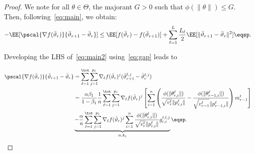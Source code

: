\documentclass[twoside]{article}
\begin{document}
\begin{proof}
We note for all $\theta \in \Theta$, the majorant $G > 0$ such that $\phi(\|\theta \|) \leq G$. 
Then, following~\eqref{eq:main}, we obtain:
\begin{align}\label{eq:main2}
- \EE[  \pscal{\nabla f(\bar{\vartheta}_r)}{\bar{\vartheta}_{r+1} - \bar{\vartheta}_r}]  \leq  \EE[ f(\bar{\vartheta}_r) - f(\bar{\vartheta}_{r+1})] + \sum_{\ell =1}^L \frac{L_\ell}{2} \EE[  \| \bar{\vartheta}_{r+1} - \bar{\vartheta}_r \|^2] \eqsp.
\end{align}

Developing the LHS of~\eqref{eq:main2} using~\eqref{eq:gap} leads to

\begin{align}\label{eq:inner}
\pscal{\nabla f(\bar{\vartheta}_r)}{\bar{\vartheta}_{r+1} - \bar{\vartheta}_r} &= \sum_{\ell=1}^\tot \sum_{j=1}^{p_\ell} \nabla_{\ell} f(\bar{\vartheta}_r)^j (\bar{\vartheta}^{\ell,j}_{r+1} - \bar{\vartheta}^{\ell,j}_r) \\
& =  \frac{\alpha \beta_1}{1-\beta_1}\frac{1}{n}  \sum_{\ell=1}^\tot \sum_{j=1}^{p_\ell} \nabla_{\ell} f(\bar{\vartheta}_r)^j \left[   \sum_{i = 1}^n  \left( \frac{\phi(\|\theta_{r,i}^{\ell}\|)}{\sqrt{v^{t}_{r}} \|p_{r,i}^{\ell}\|} - \frac{\phi(\|\theta_{r-1,i}^{\ell}\|)}{\sqrt{v^{t}_{r-1}} \|p_{r-1,i}^{\ell}\|} \right) m^{t}_{r-1}  \right] \\
& \underbrace{ -\frac{\alpha}{n} \sum_{\ell=1}^\tot \sum_{j=1}^{p_\ell} \nabla_{\ell} f(\bar{\vartheta}_r)^j  \sum_{i = 1}^n \frac{\phi(\|\theta_{r,i}^{\ell}\|)}{\sqrt{v^{t}_{r}} \|p_{r,i}^{\ell}\|} g_{r,i}^{t,l,j}}_{= A_1}   \label{eqn1} \eqsp.
\end{align}




\end{proof}
\end{document}
